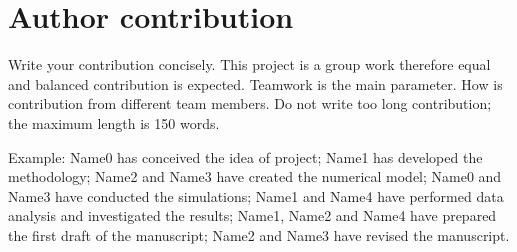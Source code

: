 \documentclass[subscriptcorrection,upint,varvw,mathalfa=cal=euler,barcolor=black,balance,hyphenate,french,pdf-a,nolists]{asmejour}
\begin{document}
\section*{Author contribution}
\label{sec:8}
Write your contribution concisely. This project is a group work therefore equal and balanced contribution is expected. Teamwork is the main parameter. How is contribution from different team members. Do not write too long contribution; the maximum length is 150 words.

Example:
Name0 has conceived the idea of project; Name1 has developed the methodology; Name2 and Name3 have created the numerical model; Name0 and Name3 have conducted the simulations; Name1 and Name4 have performed data analysis and investigated the results; Name1, Name2 and Name4 have prepared the first draft of the manuscript; Name2 and Name3 have revised the manuscript.


\begin{nomenclature}
    
    
    \vspace{0.25cm}




\end{nomenclature}

\end{document}
